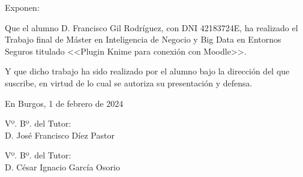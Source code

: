 \documentclass[a4paper,12pt,twoside]{memoir}
\newcommand{\nombre}{Francisco Gil Rodríguez} %
\newcommand{\titulo}{Plugin Knime para conexión con Moodle}
\newcommand{\nombretutor}{José Francisco Díez Pastor}
\newcommand{\nombrecotutor}{César Ignacio García Osorio}
\newcommand{\fecha}{1 de febrero de 2024}
\begin{document}
\noindent Exponen:

\noindent Que el alumno D. \nombre, con DNI 42183724E, ha realizado el Trabajo final de Máster en Inteligencia de Negocio y Big Data en Entornos Seguros
          titulado <<\titulo>>.

\noindent Y que dicho trabajo ha sido realizado por el alumno bajo la dirección del que suscribe, en virtud de lo cual se autoriza su presentación y defensa.

\begin{center} %
En Burgos, {\large \fecha}
\end{center}

\vfill\vfill\vfill

\begin{minipage}{0.45\textwidth}
\begin{flushleft} %
Vº. Bº. del Tutor:\\[2cm]
D. \nombretutor
\end{flushleft}
\end{minipage}
\hfill
\begin{minipage}{0.45\textwidth}
\begin{flushleft} %
Vº. Bº. del Tutor:\\[2cm]
D. \nombrecotutor
\end{flushleft}
\end{minipage}
\hfill

\vfill


\newpage\null\thispagestyle{empty}\newpage



\frontmatter

\renewcommand*\abstractname{Resumen}
\begin{abstract}

KNIME es una plataforma de código abierto orientada al análisis de datos que permite, a través de una interfaz intuitiva y visual, 
crear análisis complejos y flujos de trabajo mediante componentes especializados en diferentes áreas como la minería de datos, 
el aprendizaje automático o la visualización de datos. Moodle es una plataforma de aprendizaje (Learning Management System) ampliamente 
utilizada por instituciones educativas de todo el mundo. En este trabajo se han desarrollado nuevos componentes de KNIME que permiten la 
integración en flujos de trabajo de KNIME de los datos que Moodle va registrando durante la ejecución de una acción formativa. 
Con un enfoque orientado al rol de profesor, se pretende que cualquier usuario con este rol dentro de una 
plataforma Moodle, pueda realizar estudios externos sobre los datos de las acciones formativas a las que tiene acceso. 
Adicionalmente se ha implementado un flujo de trabajo en KNIME sobre datos reales extraidos de Moodle, analizando diferentes 
técnicas de aprendizaje automático supervisado. 

\end{abstract}
\end{document}
